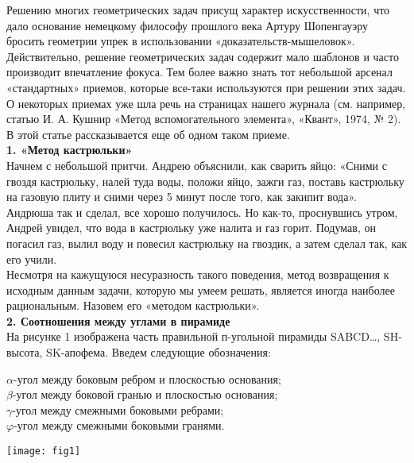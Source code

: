 \begin{spacing}{1.1}
\begin{large}
\begin{multicols*}{2}
\noindent Решению многих геометрических задач присущ характер искусственности, что дало основание немецкому философу прошлого века Артуру Шопенгауэру бросить геометрии упрек в использовании «доказательств-мышеловок». Действительно, решение геометрических задач содержит мало шаблонов и часто производит впечатление фокуса. Тем более важно знать тот небольшой арсенал «стандартных» приемов, которые все-таки используются при решении этих задач. О некоторых приемах уже шла речь на страницах нашего журнала (см. например, статью И. А. Кушнир «Метод вспомогательного элемента», «Квант», 1974, № 2). В этой статье рассказывается еще об одном таком приеме.\\


\noindent\textbf{1. «Метод кастрюльки»}\\
Начнем с небольшой притчи. Андрею объяснили, как сварить яйцо: «Сними с гвоздя кастрюльку, налей туда воды, положи яйцо, зажги газ, поставь кастрюльку на газовую плиту и сними через 5 минут после того, как закипит вода». Андрюша так и сделал, все хорошо получилось. Но как-то, проснувшись утром, Андрей увидел, что вода в кастрюльку уже налита и газ горит. Подумав, он погасил газ, вылил воду и повесил кастрюльку на гвоздик, а затем сделал так, как его учили.\\
\indent Несмотря на кажущуюся несуразность такого поведения, метод возвращения к исходным данным задачи, которую мы умеем решать, является иногда наиболее рациональным. Назовем его «методом кастрюльки».\\

\noindent\textbf{2. Соотношения между углами в пирамиде}\\
На рисунке 1 изображена часть правильной п-угольной пирамиды SABCD…, SH-высота, SK-апофема. Введем следующие обозначения:

\leftskip=0.5cm
\noindent$\alpha$-угол между боковым ребром и плоскостью основания;\\
$\beta$-угол между боковой гранью и плоскостью основания;\\
$\gamma$-угол между смежными боковыми ребрами;\\
$\varphi$-угол между смежными боковыми гранями.

\leftskip=0cm
\vspace*{0.5cm}
\noindent\texttt{[image: fig1]}
\end{multicols*}
\end{large}
\end{spacing}

